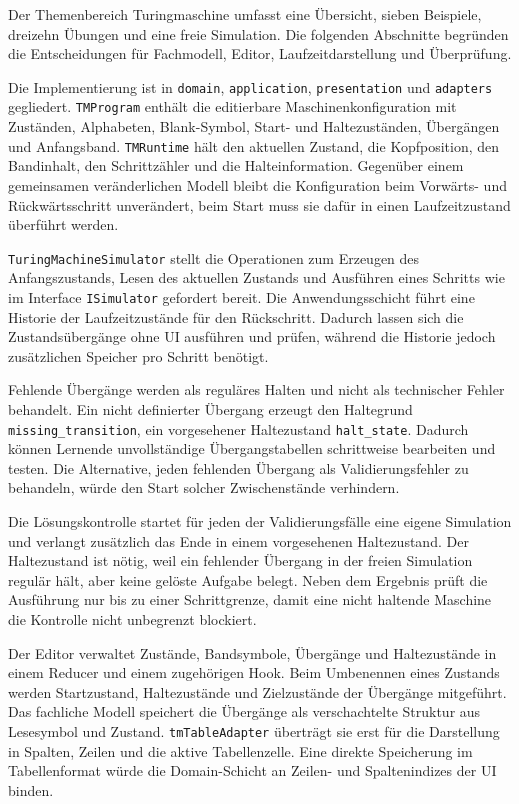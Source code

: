 
Der Themenbereich Turingmaschine umfasst eine Übersicht, sieben Beispiele, dreizehn Übungen und eine freie Simulation. Die folgenden Abschnitte begründen die Entscheidungen für Fachmodell, Editor, Laufzeitdarstellung und Überprüfung.


Die Implementierung ist in \verb|domain|, \verb|application|, \verb|presentation| und \verb|adapters| gegliedert. \verb|TMProgram| enthält die editierbare Maschinenkonfiguration mit Zuständen, Alphabeten, Blank-Symbol, Start- und Haltezuständen, Übergängen und Anfangsband. \verb|TMRuntime| hält den aktuellen Zustand, die Kopfposition, den Bandinhalt, den Schrittzähler und die Halteinformation. Gegenüber einem gemeinsamen veränderlichen Modell bleibt die Konfiguration beim Vorwärts- und Rückwärtsschritt unverändert, beim Start muss sie dafür in einen Laufzeitzustand überführt werden.

\verb|TuringMachineSimulator| stellt die Operationen zum Erzeugen des Anfangszustands, Lesen des aktuellen Zustands und Ausführen eines Schritts wie im Interface \verb|ISimulator| gefordert bereit. Die Anwendungsschicht führt eine Historie der Laufzeitzustände für den Rückschritt. Dadurch lassen sich die Zustandsübergänge ohne UI ausführen und prüfen, während die Historie jedoch zusätzlichen Speicher pro Schritt benötigt.

Fehlende Übergänge werden als reguläres Halten und nicht als technischer Fehler behandelt. Ein nicht definierter Übergang erzeugt den Haltegrund \verb|missing_transition|, ein vorgesehener Haltezustand \verb|halt_state|. Dadurch können Lernende unvollständige Übergangstabellen schrittweise bearbeiten und testen. Die Alternative, jeden fehlenden Übergang als Validierungsfehler zu behandeln, würde den Start solcher Zwischenstände verhindern.

Die Lösungskontrolle startet für jeden der Validierungsfälle eine eigene Simulation und verlangt zusätzlich das Ende in einem vorgesehenen Haltezustand. Der Haltezustand ist nötig, weil ein fehlender Übergang in der freien Simulation regulär hält, aber keine gelöste Aufgabe belegt. Neben dem Ergebnis prüft die Ausführung nur bis zu einer Schrittgrenze, damit eine nicht haltende Maschine die Kontrolle nicht unbegrenzt blockiert.

Der Editor verwaltet Zustände, Bandsymbole, Übergänge und Haltezustände in einem Reducer und einem zugehörigen Hook. Beim Umbenennen eines Zustands werden Startzustand, Haltezustände und Zielzustände der Übergänge mitgeführt. Das fachliche Modell speichert die Übergänge als verschachtelte Struktur aus Lesesymbol und Zustand. \verb|tmTableAdapter| überträgt sie erst für die Darstellung in Spalten, Zeilen und die aktive Tabellenzelle. Eine direkte Speicherung im Tabellenformat würde die Domain-Schicht an Zeilen- und Spaltenindizes der UI binden.

